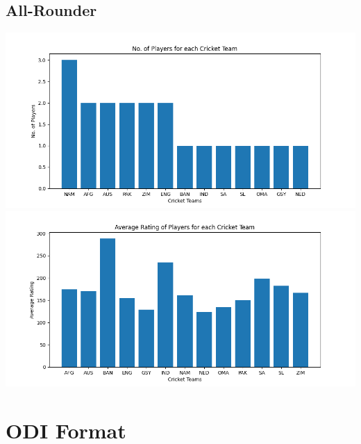 \documentclass{article}
\begin{document}
\begin{normalsize}
            \subsection{All-Rounder}\label{subsec:all-rounder1}
                \includegraphics[scale=0.7]{t20i_all-rounder-1}
                \vspace{1em}\\
                \includegraphics[scale=0.7]{t20i_all-rounder-2}

        \vspace{2em}

        \section{ODI Format}\label{sec:odi-format}

\end{normalsize}
\end{document}
